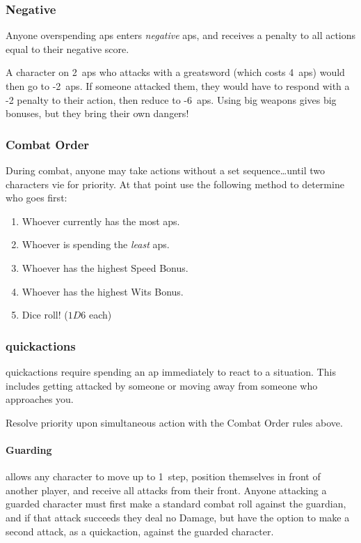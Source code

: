 \begin{multicols}{2}
\subsubsection{Negative }
Anyone overspending \glspl{ap} enters \emph{negative} \glspl{ap}, and receives a penalty to all actions equal to their negative score.

\begin{exampletext}
  A character on 2~\glspl{ap} who attacks with a greatsword (which costs 4~\glspl{ap}) would then go to -2~\glspl{ap}.
  If someone attacked them, they would have to respond with a -2 penalty to their action, then reduce to -6~\glspl{ap}.
  Using big weapons gives big bonuses, but they bring their own dangers!
\end{exampletext}

\subsubsection{Combat Order}

﻿During combat, anyone may take actions without a set sequence\ldots until two characters vie for priority.
At that point use the following method to determine who goes first:

\begin{enumerate}
  \item
  Whoever currently has the most \glspl{ap}.
  \item
  Whoever is spending the \emph{least} \glspl{ap}.
  \item
  Whoever has the highest Speed Bonus.
  \item
  Whoever has the highest Wits Bonus.
  \item
  Dice roll! ($1D6$ each)
\end{enumerate}

\subsubsection{\Glspl{quickaction}}

\Glspl{quickaction} require spending an \gls{ap} immediately to react to a situation.
This includes getting attacked by someone or moving away from someone who approaches you.

Resolve priority upon simultaneous action with the Combat Order rules above.

\paragraph{Guarding}
\label{guarding}
allows any character to move up to 1~\gls{step}, position themselves in front of another player, and receive all attacks from their front.
Anyone attacking a guarded character must first make a standard combat roll against the guardian, and if that attack succeeds they deal no Damage, but have the option to make a second attack, as a \gls{quickaction}, against the guarded character.


\end{multicols}
